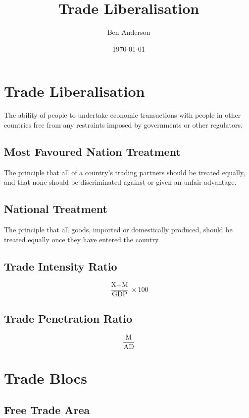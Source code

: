 \documentclass[a4paper,11pt]{article}
\begin{document}
\title{Trade Liberalisation}
\author{Ben Anderson}
\date{\today}
\maketitle
\pagebreak

\tableofcontents
\pagebreak


\section{Trade Liberalisation}

The ability of people to undertake economic transactions with people in other
countries free from any restraints imposed by governments or other regulators.


\subsection{Most Favoured Nation Treatment}

The principle that all of a country's trading partners should be treated
equally, and that none should be discriminated against or given an unfair
advantage.


\subsection{National Treatment}

The principle that all goods, imported or domestically produced, should be
treated equally once they have entered the country.


\subsection{Trade Intensity Ratio}

$$
\frac{\text{X} + \text{M}}{\text{GDP}} \times 100
$$


\subsection{Trade Penetration Ratio}

$$
\frac{\text{M}}{\text{AD}}
$$




\section{Trade Blocs}

\subsection{Free Trade Area}
\end{document}

